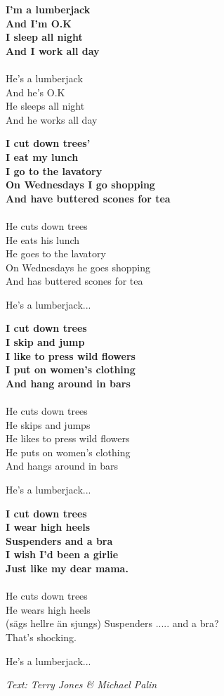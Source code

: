 \vspace{10pt}
\textbf{
I'm a lumberjack\\
And I'm O.K\\
I sleep all night\\
And I work all day\\
}
\\
He's a lumberjack\\
And he's O.K\\
He sleeps all night\\
And he works all day\par
\vspace{10pt}
\textbf{
I cut down trees'\\
I eat my lunch\\
I go to the lavatory\\
On Wednesdays I go shopping\\
And have buttered scones for tea\\
}
\\
He cuts down trees\\
He eats his lunch\\
He goes to the lavatory\\
On Wednesdays he goes shopping\\
And has buttered scones for tea\par
\vspace{10pt}
He's a lumberjack...\par
\vspace{10pt}
\textbf{
I cut down trees\\
I skip and jump\\
I like to press wild flowers\\
I put on women's clothing\\
And hang around in bars\\
}
\\
He cuts down trees\\
He skips and jumps\\
He likes to press wild flowers\\
He puts on women's clothing\\
And hangs around in bars\par
\vspace{10pt}
He's a lumberjack...\par
\vspace{10pt}
\textbf{
I cut down trees\\
I wear high heels\\
Suspenders and a bra\\
I wish I'd been a girlie\\
Just like my dear mama.\\
}
\\
He cuts down trees\\
He wears high heels\\
(sägs hellre än sjungs) Suspenders ..... and a bra?\\
That's shocking.\par
\vspace{10pt}
He's a lumberjack...
\par
\vspace{10pt}
{\footnotesize\textit{Text: Terry Jones \& Michael Palin}}

